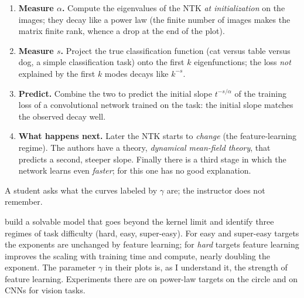 \begin{enumerate}
  \item \textbf{Measure $\alpha$.} Compute the eigenvalues of the NTK \emph{at initialization} on the images; they decay like a power law (the finite number of images makes the matrix finite rank, whence a drop at the end of the plot).
  \item \textbf{Measure $s$.} Project the true classification function (cat versus table versus dog, a simple classification task) onto the first $k$ eigenfunctions; the loss \emph{not} explained by the first $k$ modes decays like $k^{-s}$.
  \item \textbf{Predict.} Combine the two to predict the initial slope $t^{-s/\alpha}$ of the training loss of a convolutional network trained on the task: the initial slope matches the observed decay well.
  \item \textbf{What happens next.} Later the NTK starts to \emph{change} (the feature-learning regime). The authors have a theory, \emph{dynamical mean-field theory}, that predicts a second, steeper slope. Finally there is a third stage in which the network learns even \emph{faster}; for this one has no good explanation.
\end{enumerate}
A student asks what the curves labeled by $\gamma$ are; the instructor does not remember.

\begin{beyond}
\citet{bordelon2025} build a solvable model that goes beyond the kernel limit and identify three regimes of task difficulty (hard, easy, super-easy). For easy and super-easy targets the exponents are unchanged by feature learning; for \emph{hard} targets feature learning improves the scaling with training time and compute, nearly doubling the exponent. The parameter $\gamma$ in their plots is, as I understand it, the strength of feature learning. Experiments there are on power-law targets on the circle and on CNNs for vision tasks.
\end{beyond}

